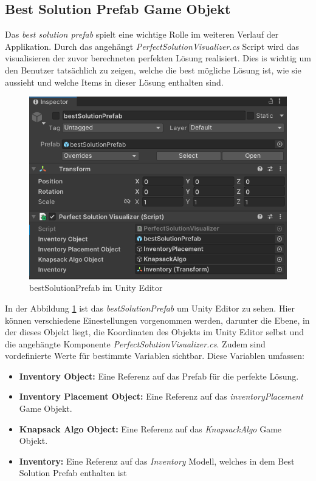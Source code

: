 \subsection{Best Solution Prefab Game Objekt}
Das \textit{best solution prefab} spielt eine wichtige Rolle im weiteren Verlauf der Applikation. Durch das angehängt
\textit{PerfectSolutionVisualizer.cs} Script wird das visualisieren der zuvor berechneten perfekten Lösung
realisiert. Dies is wichtig um den Benutzer tatsächlich zu zeigen, welche die best mögliche Lösung ist, wie sie aussieht
und welche Items in dieser Lösung enthalten sind.

\begin{figure}[h]
    \centering
    \includegraphics[scale=0.8]{images/bestSolPref_Editor}
    \caption{bestSolutionPrefab im Unity Editor}
    \label{fig:bestSol_Editor}
\end{figure}

In der Abbildung \ref{fig:bestSol_Editor} ist das \textit{bestSolutionPrefab} um Unity Editor zu sehen. Hier können verschiedene
Einestellungen vorgenommen werden, darunter die Ebene, in der dieses Objekt liegt, die Koordinaten des Objekts im
Unity Editor selbst und die angehängte Komponente \textit{PerfectSolutionVisualizer.cs}. Zudem sind vordefinierte Werte für
bestimmte Variablen sichtbar. Diese Variablen umfassen:
\begin{itemize}
    \item \textbf{Inventory Object:} Eine Referenz auf das Prefab für die perfekte Lösung.
    \item \textbf{Inventory Placement Object:} Eine Referenz auf das \textit{inventoryPlacement} Game Objekt.
    \item \textbf{Knapsack Algo Object:} Eine Referenz auf das \textit{KnapsackAlgo} Game Objekt.
    \item \textbf{Inventory:} Eine Referenz auf das \textit{Inventory} Modell, welches in dem Best Solution Prefab enthalten ist
\end{itemize}

